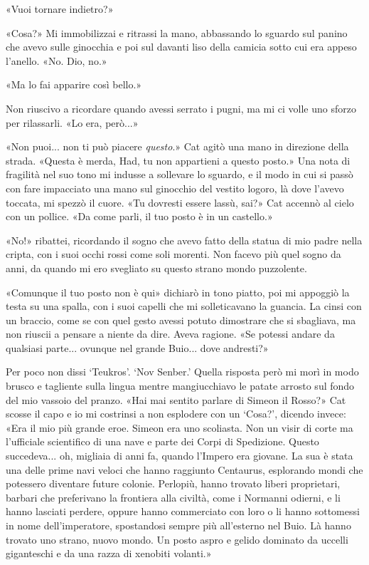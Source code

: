 «Vuoi tornare indietro?»

«Cosa?» Mi immobilizzai e ritrassi la mano, abbassando lo sguardo sul
panino che avevo sulle ginocchia e poi sul davanti liso della camicia
sotto cui era appeso l'anello. «No. Dio, no.»

«Ma lo fai apparire così bello.»

Non riuscivo a ricordare quando avessi serrato i pugni, ma mi ci volle
uno sforzo per rilassarli. «Lo era, però...»

«Non puoi... non ti può piacere \emph{questo}.» Cat agitò una mano in
direzione della strada. «Questa è merda, Had, tu non appartieni a questo
posto.» Una nota di fragilità nel suo tono mi indusse a sollevare lo
sguardo, e il modo in cui si passò con fare impacciato una mano sul
ginocchio del vestito logoro, là dove l'avevo toccata, mi spezzò il
cuore. «Tu dovresti essere lassù, sai?» Cat accennò al cielo con un
pollice. «Da come parli, il tuo posto è in un castello.»

«No!» ribattei, ricordando il sogno che avevo fatto della statua di mio
padre nella cripta, con i suoi occhi rossi come soli morenti. Non facevo
più quel sogno da anni, da quando mi ero svegliato su questo strano
mondo puzzolente.

«Comunque il tuo posto non è qui» dichiarò in tono piatto, poi mi
appoggiò la testa su una spalla, con i suoi capelli che mi
{solleticavano} la guancia. La cinsi con un braccio, come se con quel
gesto avessi potuto dimostrare che si sbagliava, ma non riuscii a
pensare a niente da dire. Aveva ragione. «Se potessi andare da qualsiasi
parte... ovunque nel grande Buio... dove andresti?»

Per poco non dissi `Teukros'. `Nov Senber.' Quella risposta però mi morì
in modo brusco e tagliente sulla lingua mentre mangiucchiavo le patate
arrosto sul fondo del mio vassoio del pranzo. «Hai mai sentito parlare
di Simeon il Rosso?» Cat scosse il capo e io mi costrinsi a non
esplodere con un `Cosa?', dicendo invece: «Era il mio più grande eroe.
Simeon era uno scoliasta. Non un visir di corte ma l'ufficiale
scientifico di una nave e parte dei Corpi di Spedizione. Questo
succedeva... oh, migliaia di anni fa, quando l'Impero era giovane. La
sua è stata una delle prime navi veloci che hanno raggiunto Centaurus,
esplorando mondi che potessero diventare future colonie. Perlopiù, hanno
trovato liberi proprietari, barbari che preferivano la frontiera alla
civiltà, come i Normanni odierni, e li hanno lasciati perdere, oppure
hanno commerciato con loro o li hanno sottomessi in nome
dell'imperatore, spostandosi sempre più all'esterno nel Buio. Là hanno
trovato uno strano, nuovo mondo. Un posto aspro e gelido dominato da
uccelli giganteschi e da una razza di xenobiti volanti.»


